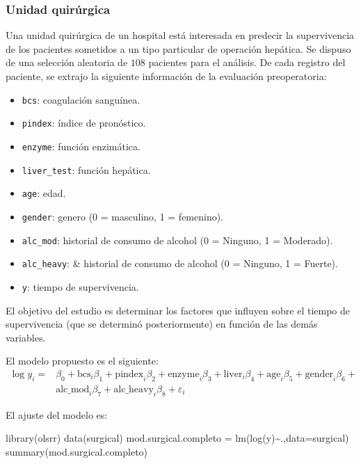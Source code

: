 \documentclass[
]{article}
\newenvironment{Shaded}{\begin{snugshade}}{\end{snugshade}}
\newcommand{\AttributeTok}[1]{\textcolor[rgb]{0.77,0.63,0.00}{#1}}
\newcommand{\FunctionTok}[1]{\textcolor[rgb]{0.00,0.00,0.00}{#1}}
\newcommand{\NormalTok}[1]{#1}
\newcommand{\OtherTok}[1]{\textcolor[rgb]{0.56,0.35,0.01}{#1}}
\newcommand{\SpecialCharTok}[1]{\textcolor[rgb]{0.00,0.00,0.00}{#1}}
\begin{document}
\hypertarget{unidad-quiruxfargica}{%
\subsubsection{Unidad quirúrgica}\label{unidad-quiruxfargica}}

Una unidad quirúrgica de un hospital está interesada en predecir la supervivencia de los pacientes sometidos a un tipo particular de operación hepática. Se dispuso de una selección aleatoria de \(108\) pacientes para el análisis. De cada registro del paciente, se extrajo la siguiente información de la evaluación preoperatoria:

\begin{itemize}
\item
  \texttt{bcs}: coagulación sanguínea.
\item
  \texttt{pindex}: índice de pronóstico.
\item
  \texttt{enzyme}: función enzimática.
\item
  \texttt{liver\_test}: función hepática.
\item
  \texttt{age}: edad.
\item
  \texttt{gender}: genero (0 = masculino, 1 = femenino).
\item
  \texttt{alc\_mod}: historial de consumo de alcohol (0 = Ninguno, 1 = Moderado).
\item
  \texttt{alc\_heavy}: \& historial de consumo de alcohol (0 = Ninguno, 1 = Fuerte).
\item
  \texttt{y}: tiempo de supervivencia.
\end{itemize}

El objetivo del estudio es determinar los factores que influyen sobre el tiempo de supervivencia (que se determinó posteriormente) en función de las demás variables.

El modelo propuesto es el siguiente:
\begin{equation}
\begin{split}
\log y_{i} =& \beta_{0}+\mbox{bcs}_{i}\beta_{1} + \mbox{pindex}_{i}\beta_{2}+ \mbox{enzyme}_{i}\beta_{3} +  \mbox{liver}_{i}\beta_{4} + \mbox{age}_{i}\beta_{5} +  \mbox{gender}_{i}\beta_{6}+ \\ & \mbox{alc_mod}_{i}\beta_{7} + \mbox{alc_heavy}_{i}\beta_{8} + \varepsilon_{i}
\end{split}
\nonumber
\end{equation}

El ajuste del modelo es:

\begin{Shaded}
\begin{Highlighting}[]
\FunctionTok{library}\NormalTok{(olsrr)}
\FunctionTok{data}\NormalTok{(surgical)}
\NormalTok{mod.surgical.completo }\OtherTok{=} \FunctionTok{lm}\NormalTok{(}\FunctionTok{log}\NormalTok{(y)}\SpecialCharTok{\textasciitilde{}}\NormalTok{.,}\AttributeTok{data=}\NormalTok{surgical)}
\FunctionTok{summary}\NormalTok{(mod.surgical.completo)}
\end{Highlighting}
\end{Shaded}
\end{document}
